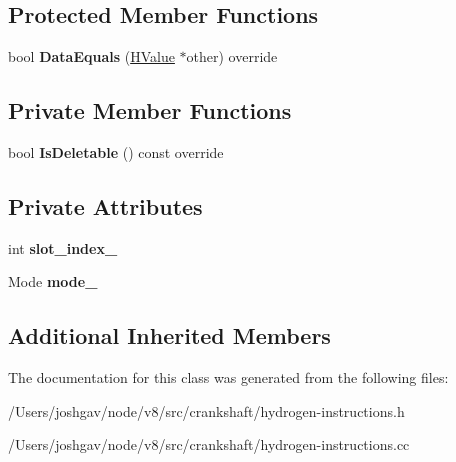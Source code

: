 \subsection*{Protected Member Functions}
\begin{DoxyCompactItemize}
\item 
bool {\bfseries Data\+Equals} (\hyperlink{classv8_1_1internal_1_1_h_value}{H\+Value} $\ast$other) override\hypertarget{classv8_1_1internal_1_1_h_load_context_slot_a703134b9bf30ec182a15779b0b877790}{}\label{classv8_1_1internal_1_1_h_load_context_slot_a703134b9bf30ec182a15779b0b877790}

\end{DoxyCompactItemize}
\subsection*{Private Member Functions}
\begin{DoxyCompactItemize}
\item 
bool {\bfseries Is\+Deletable} () const  override\hypertarget{classv8_1_1internal_1_1_h_load_context_slot_a5aa8f5670f6729a98e27c7627cc2f0b3}{}\label{classv8_1_1internal_1_1_h_load_context_slot_a5aa8f5670f6729a98e27c7627cc2f0b3}

\end{DoxyCompactItemize}
\subsection*{Private Attributes}
\begin{DoxyCompactItemize}
\item 
int {\bfseries slot\+\_\+index\+\_\+}\hypertarget{classv8_1_1internal_1_1_h_load_context_slot_ae341702275c185e81447242b03dad143}{}\label{classv8_1_1internal_1_1_h_load_context_slot_ae341702275c185e81447242b03dad143}

\item 
Mode {\bfseries mode\+\_\+}\hypertarget{classv8_1_1internal_1_1_h_load_context_slot_a7060ba1347305ce98f6bbc2d289ffb04}{}\label{classv8_1_1internal_1_1_h_load_context_slot_a7060ba1347305ce98f6bbc2d289ffb04}

\end{DoxyCompactItemize}
\subsection*{Additional Inherited Members}


The documentation for this class was generated from the following files\+:\begin{DoxyCompactItemize}
\item 
/\+Users/joshgav/node/v8/src/crankshaft/hydrogen-\/instructions.\+h\item 
/\+Users/joshgav/node/v8/src/crankshaft/hydrogen-\/instructions.\+cc\end{DoxyCompactItemize}
